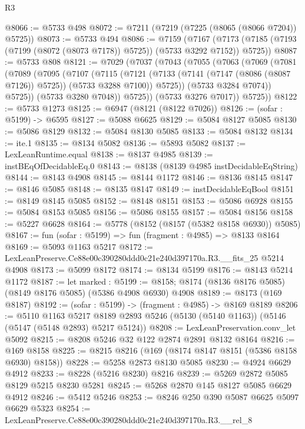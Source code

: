 \begin{lexlean}{R3}
\begin{coremodule}
@8066 := @5733 @498
@8072 := @7211 (@7219 (@7225 (@8065 (@8066 @7204)) @5725))
@8073 := @5733 @494
@8086 := @7159
    (@7167 (@7173 (@7185 (@7193 (@7199 (@8072 (@8073 @7178)) @5725)) (@5733 @3292 @7152)) @5725))
@8087 := @5733 @808
@8121 := @7029
    (@7037
      (@7043
        (@7055
          (@7063
            (@7069
              (@7081
                (@7089
                  (@7095
                    (@7107
                      (@7115
                        (@7121
                          (@7133 (@7141 (@7147 (@8086 (@8087 @7126)) @5725)) (@5733 @3288 @7100))
                          @5725))
                      (@5733 @3284 @7074))
                    @5725))
                (@5733 @3280 @7048))
              @5725))
          (@5733 @3276 @7017))
        @5725))
@8122 := @5733 @1273
@8125 := @6947 (@8121 (@8122 @7026))
@8126 := (sofar : @5199) -> @6595
@8127 := @5088 @6625
@8129 := @5084 @8127 @5085
@8130 := @5086 @8129
@8132 := @5084 @8130 @5085
@8133 := @5084 @8132
@8134 := ite.{1}
@8135 := @8134 @5082
@8136 := @5893 @5082
@8137 := LexLeanRuntime.equal
@8138 := @8137 @4985
@8139 := instBEqOfDecidableEq.{0}
@8143 := @8138 (@8139 @4985 instDecidableEqString)
@8144 := @8143 @4908
@8145 := @8144 @1172
@8146 := @8136 @8145
@8147 := @8146 @5085
@8148 := @8135 @8147
@8149 := instDecidableEqBool
@8151 := @8149 @8145 @5085
@8152 := @8148 @8151
@8153 := @5086 @6928
@8155 := @5084 @8153 @5085
@8156 := @5086 @8155
@8157 := @5084 @8156
@8158 := @5227 @6628
@8164 := @5778 (@8152 (@8157 (@5382 @8158 @6930)) @5085)
@8167 := fun (sofar : @5199) => fun (fragment : @4985) => @8133 @8164
@8169 := @5093 @1163 @5217
@8172 := LexLeanPreserve.Ce88e00c390280ddd0c21e240d397170a.R3.__fits_25 @5214 @4908
@8173 := @5099 @8172
@8174 := @8134 @5199
@8176 := @8143 @5214 @1172
@8187 := let marked : @5199 := @8158;
  @8174 (@8136 @8176 @5085) (@8149 @8176 @5085) (@5386 @4908 @6930) @4908
@8189 := @8173 (@169 @8187)
@8192 := (sofar : @5199) -> (fragment : @4985) -> @8169 @8189
@8206 := @5110
    @1163
    @5217
    @8189
    @2893
    @5246
    (@5130 (@5140 @1163))
    (@5146 (@5147 (@5148 @2893) @5217 @5124))
@8208 := LexLeanPreservation.conv_let @5092
@8215 := @8208 @5246 @32 @122 @2874 @2891 @8132 @8164
@8216 := @169 @8158
@8225 := @8215 @8216 (@169 (@8174 @8147 @8151 (@5386 @8158 @6930) @8158))
@8228 := @5258 @2873 @8130 @5085
@8230 := @4924 @6629 @4912
@8233 := @8228 (@5216 @8230) @8216
@8239 := @5269 @2872 @5085 @8129 @5215 @8230 @5281
@8245 := @5268 @2870 @145 @8127 @5085 @6629 @4912
@8246 := @5412 @5246
@8253 := @8246 @250 @390 @5087 @6625 @5097 @6629 @5323
@8254 := LexLeanPreserve.Ce88e00c390280ddd0c21e240d397170a.R3.__rel_8

\end{coremodule}
\end{lexlean}

